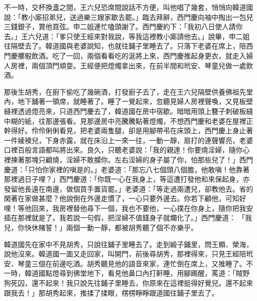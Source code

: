 不一時，交杯換盞之間，王六兒恐席間說話不方便，叫他唱了幾套，悄悄向韓道國說：「教小廝招弟兒，送過樂三嫂家歇去罷。」臨去拜辭，西門慶向袖中掏出一包兒三錢銀子，賞他買弦。申二姐連忙嗑頭謝了。西門慶約下：「我初八日使人請你去。」王六兒道：「爹只使王經來對我說，等我這裡教小廝請他去。」說畢，申二姐往隔壁去了。韓道國與老婆說知，也就往鋪子里睡去了。只落下老婆在席上，陪西門慶擲骰飲酒。吃了一回，兩個看看吃的涎將上來，西門慶推起身更衣，就走入婦人房裡，兩個頂門頑耍。王經便把燈燭拿出來，在前半間和玳安、琴童兒做一處飲酒。

那後生胡秀，在廚下偷吃了幾碗酒，打發廚子去了，走在王六兒隔壁供養佛祖先堂內，地下鋪著一領席，就睡著了。睡了一覺起來，忽聽見婦人房裡聲喚，又見板壁縫裡透過燈亮來，只道西門慶去了，韓道國在房中宿歇。暗暗用頭上簪子刺破板縫中糊的紙，往那邊張看。見那邊房中亮騰騰點著燈燭，不想西門慶和老婆在屋裡正幹得好。伶伶俐俐看見，把老婆兩隻腿，卻是用腳帶弔在床頭上，西門慶上身止著一件綾襖兒，下身赤露，就在床沿上一來一往，一動一靜，扇打的連聲響亮，老婆口裡百般言語都叫將出來。良久，只聽老婆說：「我的親達！你要燒淫婦，隨你心裡揀著那塊只顧燒，淫婦不敢攔你。左右淫婦的身子屬了你，怕那些兒了！」西門慶道：「只怕你家裡的嗔是的。」老婆道：「那忘八七個頭八個膽，他敢嗔！他靠著那裡過日子哩？」西門慶道：「你既一心在我身上，等這遭打發他和來保起身，亦發留他長遠在南邊，做個買手置貨罷。」老婆道：「等走過兩遭兒，卻教他去。省的閑著在家做甚麼？他說倒在外邊走慣了，一心只要外邊去。你若下顧他，可知好哩！等他回來，我房裡替他尋下一個，我也不要他，一心撲在你身上，隨你把我安插在那裡就是了。我若說一句假，把淫婦不值錢身子就爛化了。」西門慶道： 「我兒，你快休賭誓！」兩個一動一靜，都被胡秀聽了個不亦樂乎。

韓道國先在家中不見胡秀，只說往鋪子里睡去了。走到緞子鋪里，問王顯、榮海，說他沒來。韓道國一面又走回家，叫開門，前後尋胡秀，那裡得來，只見王經陪玳安、琴童三個在前邊吃酒。胡秀聽見他的語音來家，連忙倒在席上，又推睡了。不一時，韓道國點燈尋到佛堂地下，看見他鼻口內打鼾睡，用腳踢醒，罵道：「賊野狗死囚，還不起來！我只說先往鋪子里睡去，你原來在這裡挺得好覺兒。還不起來跟我去！」那胡秀起來，推揉了揉眼，楞楞睜睜跟道國往鋪子里去了。

